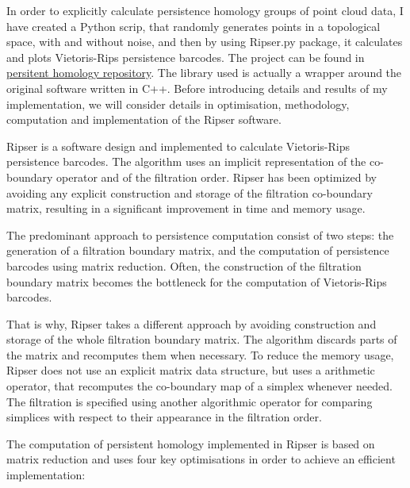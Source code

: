 \documentclass[11pt,a4paper]{report}
\begin{document}
            In order to explicitly calculate persistence homology groups of point cloud data, I have created a Python scrip, that randomly generates points in a topological space, with and without noise, and then by
            using Ripser.py package, it calculates and plots Vietoris-Rips persistence barcodes. The project can be found in 
            \href{https://github.com/kejjon/persistent_homology}{persitent homology repository}. The library used is actually a wrapper around the original software written in C++. Before introducing details and results of my implementation, we will consider details in optimisation, methodology, computation and implementation of the Ripser software.

            Ripser is a software design and implemented to calculate Vietoris-Rips persistence barcodes. The algorithm uses
            an implicit representation of the co-boundary operator and of the filtration order. Ripser has been optimized by
            avoiding any explicit construction and storage of the filtration co-boundary matrix, resulting in a significant improvement in time and memory usage.

            The predominant approach to persistence computation consist of two steps: the generation of a filtration
            boundary matrix, and the computation of persistence barcodes using matrix reduction. Often, the construction of the filtration boundary matrix becomes
                the bottleneck for the computation of Vietoris-Rips barcodes.

            That is why, Ripser takes a different approach by avoiding construction and storage of the whole filtration boundary matrix. The algorithm discards parts of the matrix and recomputes them when necessary. To reduce the memory usage, Ripser does not use an explicit matrix data structure, but uses a arithmetic operator,
            that recomputes the co-boundary map of a simplex whenever needed. The filtration is specified using another algorithmic operator for
            comparing simplices with respect to their appearance in the filtration order.

            The computation of persistent homology implemented in Ripser is based on matrix reduction and uses four key
            optimisations in order to achieve an efficient implementation:
\end{document}
